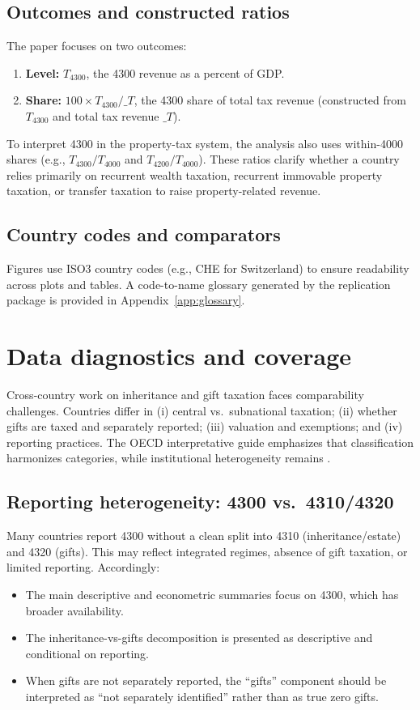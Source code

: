 \documentclass[11pt,a4paper]{article}
\newcommand{\CHE}{\textsc{CHE}}
\begin{document}
\subsection{Outcomes and constructed ratios}
The paper focuses on two outcomes:
\begin{enumerate}
  \item \textbf{Level:} $T_{4300}$, the 4300 revenue as a percent of GDP.
  \item \textbf{Share:} $100 \times T_{4300}/\_T$, the 4300 share of total tax revenue (constructed from $T_{4300}$ and total tax revenue $\_T$).
\end{enumerate}
To interpret 4300 in the property-tax system, the analysis also uses within-4000 shares (e.g., $T_{4300}/T_{4000}$ and $T_{4200}/T_{4000}$). These ratios clarify whether a country relies primarily on recurrent wealth taxation, recurrent immovable property taxation, or transfer taxation to raise property-related revenue.

\subsection{Country codes and comparators}
Figures use ISO3 country codes (e.g., \CHE{} for Switzerland) to ensure readability across plots and tables. A code-to-name glossary generated by the replication package is provided in Appendix~\ref{app:glossary}.

\section{Data diagnostics and coverage}
\label{sec:diagnostics}

Cross-country work on inheritance and gift taxation faces comparability challenges. Countries differ in (i) central vs.\ subnational taxation; (ii) whether gifts are taxed and separately reported; (iii) valuation and exemptions; and (iv) reporting practices. The OECD interpretative guide emphasizes that classification harmonizes categories, while institutional heterogeneity remains \parencite{OECDInterpretativeGuide,OECDRevenueStatsGuide}.

\subsection{Reporting heterogeneity: 4300 vs.\ 4310/4320}
Many countries report 4300 without a clean split into 4310 (inheritance/estate) and 4320 (gifts). This may reflect integrated regimes, absence of gift taxation, or limited reporting. Accordingly:
\begin{itemize}
  \item The main descriptive and econometric summaries focus on 4300, which has broader availability.
  \item The inheritance-vs-gifts decomposition is presented as descriptive and conditional on reporting.
  \item When gifts are not separately reported, the ``gifts'' component should be interpreted as ``not separately identified'' rather than as true zero gifts.
\end{itemize}
\end{document}

